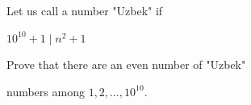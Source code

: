 Let us call a number "Uzbek" if

$10^{10} + 1 \mid n^2 + 1$

Prove that there are an even number of "Uzbek"

numbers among $1, 2, \dots, 10^{10}$.
